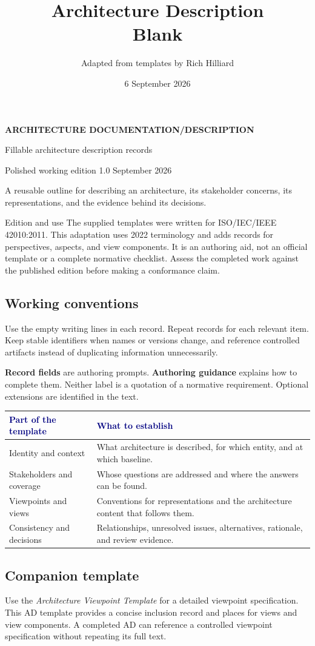 \documentclass[11pt,letterpaper]{article}
\title{Architecture Description\\Blank}
\author{Adapted from templates by Rich Hilliard}
\date{6 September 2026}
\makeatletter
\newcommand{\TableHead}[1]{\textcolor{Navy}{\sffamily\bfseries#1}}
\newcommand{\Lead}[1]{\textcolor{Muted}{#1}\par\vspace{3pt}}
\newcommand{\TemplateTitle}[3]{%
  {\sffamily\small\bfseries\color{Teal}ARCHITECTURE DOCUMENTATION\enspace /\enspace #1\par}
  \vspace{14pt}
  {\sffamily\bfseries\fontsize{29}{33}\selectfont\color{Navy}#2\par}
  \vspace{10pt}
  {\sffamily\large\color{Muted}#3\par}
  \vspace{11pt}
  {\sffamily\small\color{Muted}Polished working edition 1.0\enspace\textbullet\enspace 6 September 2026\par}
  \vspace{13pt}{\color{Teal}\hrule height 1.2pt}\vspace{9pt}}
\newcommand{\EditionNote}{%
  The supplied templates were written for ISO/IEC/IEEE 42010:2011.
  This adaptation uses 2022 terminology and adds records for perspectives,
  aspects, and view components. It is an authoring aid, not an official template
  or a complete normative checklist. Assess the completed work against the
  published edition before making a conformance claim.}
\renewcommand{\maketitle}{\TemplateTitle{DESCRIPTION}{\@title}{Fillable architecture description records}}
\makeatother
\begin{document}
\maketitle
\Lead{A reusable outline for describing an architecture, its stakeholder concerns,
its representations, and the evidence behind its decisions.}

\begin{TemplateNote}{Edition and use}
\EditionNote
\end{TemplateNote}

\subsection{Working conventions}
Use the empty writing lines in each record. Repeat records for
each relevant item. Keep stable identifiers when names or versions change, and
reference controlled artifacts instead of duplicating information unnecessarily.

\textbf{Record fields} are authoring prompts. \textbf{Authoring guidance}
explains how to complete them. Neither label is a quotation of a normative
requirement. Optional extensions are identified in the text.

{\small\raggedright\noindent
\begin{tabularx}{\linewidth}{@{}L{1.7in}Y@{}}
\toprule
\TableHead{Part of the template} & \TableHead{What to establish}\\
\midrule
Identity and context & What architecture is described, for which entity, and at which baseline.\\
Stakeholders and coverage & Whose questions are addressed and where the answers can be found.\\
Viewpoints and views & Conventions for representations and the architecture content that follows them.\\
Consistency and decisions & Relationships, unresolved issues, alternatives, rationale, and review evidence.\\
\bottomrule
\end{tabularx}\par}

\subsection{Companion template}
Use the \emph{Architecture Viewpoint Template} for a detailed viewpoint
specification. This AD template provides a concise inclusion record and places
for views and view components. A completed AD can reference a controlled
viewpoint specification without repeating its full text.
\end{document}

